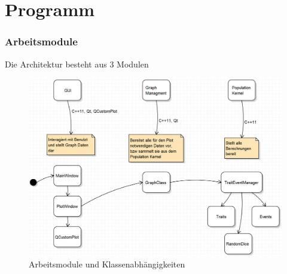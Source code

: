 \documentclass{beamer}
\begin{document}
\section{Programm}
\begin{frame}
	\frametitle{Arbeitsmodule}
	Die Architektur besteht aus 3 Modulen
	\pause
	\begin{figure}[H]
		\centering
		\includegraphics[width=0.8\linewidth]{./Pictures/Bild_Module}
		\caption[Module]{Arbeitsmodule und Klassenabhängigkeiten}
		\label{Module und Klassen}
	\end{figure}
\end{frame}
\end{document}
